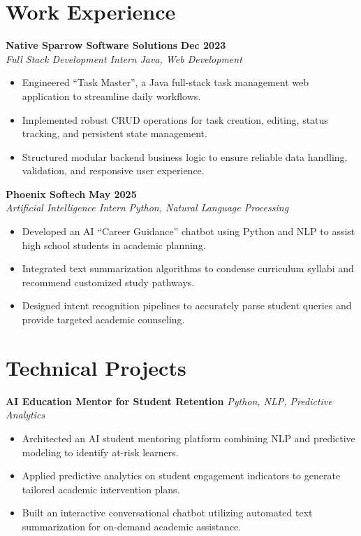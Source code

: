 \documentclass[10pt,letterpaper]{article}
\newcommand{\resumeSubheading}[4]{
  \vspace{2.5pt}
  \textbf{#1} \hfill \textbf{#2}\\
  \textit{#3} \hfill \textit{#4}\\
  \vspace{-1.5pt}
}
\newcommand{\resumeProjectHeading}[2]{
  \vspace{3.5pt}
  \textbf{#1} \hfill \textit{#2}\\
  \vspace{-1.5pt}
}
\begin{document}
\section{Work Experience}

\resumeSubheading
  {Native Sparrow Software Solutions}{Dec 2023}
  {Full Stack Development Intern}{Java, Web Development}
  \begin{itemize}
    \item Engineered ``Task Master'', a Java full-stack task management web application to streamline daily workflows.
    \item Implemented robust CRUD operations for task creation, editing, status tracking, and persistent state management.
    \item Structured modular backend business logic to ensure reliable data handling, validation, and responsive user experience.
  \end{itemize}

\resumeSubheading
  {Phoenix Softech}{May 2025}
  {Artificial Intelligence Intern}{Python, Natural Language Processing}
  \begin{itemize}
    \item Developed an AI ``Career Guidance'' chatbot using Python and NLP to assist high school students in academic planning.
    \item Integrated text summarization algorithms to condense curriculum syllabi and recommend customized study pathways.
    \item Designed intent recognition pipelines to accurately parse student queries and provide targeted academic counseling.
  \end{itemize}

\section{Technical Projects}

\resumeProjectHeading
  {AI Education Mentor for Student Retention}{Python, NLP, Predictive Analytics}
  \begin{itemize}
    \item Architected an AI student mentoring platform combining NLP and predictive modeling to identify at-risk learners.
    \item Applied predictive analytics on student engagement indicators to generate tailored academic intervention plans.
    \item Built an interactive conversational chatbot utilizing automated text summarization for on-demand academic assistance.
  \end{itemize}
\end{document}
